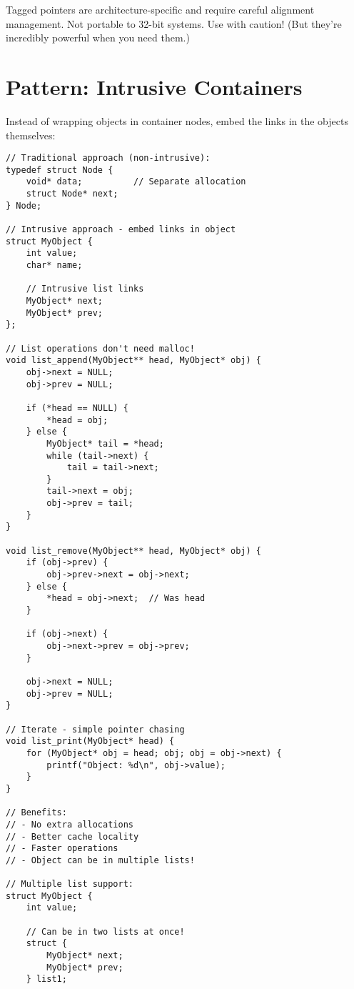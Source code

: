 \begin{warningbox}
Tagged pointers are architecture-specific and require careful alignment management. Not portable to 32-bit systems. Use with caution! (But they're incredibly powerful when you need them.)
\end{warningbox}

\section{Pattern: Intrusive Containers}

Instead of wrapping objects in container nodes, embed the links in the objects themselves:

\begin{lstlisting}
// Traditional approach (non-intrusive):
typedef struct Node {
    void* data;          // Separate allocation
    struct Node* next;
} Node;

// Intrusive approach - embed links in object
struct MyObject {
    int value;
    char* name;

    // Intrusive list links
    MyObject* next;
    MyObject* prev;
};

// List operations don't need malloc!
void list_append(MyObject** head, MyObject* obj) {
    obj->next = NULL;
    obj->prev = NULL;

    if (*head == NULL) {
        *head = obj;
    } else {
        MyObject* tail = *head;
        while (tail->next) {
            tail = tail->next;
        }
        tail->next = obj;
        obj->prev = tail;
    }
}

void list_remove(MyObject** head, MyObject* obj) {
    if (obj->prev) {
        obj->prev->next = obj->next;
    } else {
        *head = obj->next;  // Was head
    }

    if (obj->next) {
        obj->next->prev = obj->prev;
    }

    obj->next = NULL;
    obj->prev = NULL;
}

// Iterate - simple pointer chasing
void list_print(MyObject* head) {
    for (MyObject* obj = head; obj; obj = obj->next) {
        printf("Object: %d\n", obj->value);
    }
}

// Benefits:
// - No extra allocations
// - Better cache locality
// - Faster operations
// - Object can be in multiple lists!

// Multiple list support:
struct MyObject {
    int value;

    // Can be in two lists at once!
    struct {
        MyObject* next;
        MyObject* prev;
    } list1;


\end{lstlisting}
